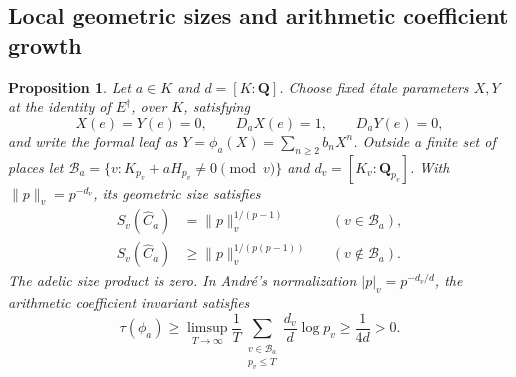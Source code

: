 \documentclass[11pt]{article}
\newtheorem{proposition}[theorem]{Proposition}
\theoremstyle{definition}\newtheorem{definition}[theorem]{Definition}
\theoremstyle{remark}\newtheorem{remark}[theorem]{Remark}
\newcommand{\Q}{\mathbf Q}\newcommand{\Z}{\mathbf Z}
\begin{document}
\subsection{Local geometric sizes and arithmetic coefficient growth}
\begin{proposition}\label{prop:leaf-sizes}
Let $a\in K$ and $d=[K:\Q]$. Choose fixed \'etale parameters $X,Y$ at the identity of $E^\dagger$, over $K$, satisfying
\[
 X(e)=Y(e)=0,\qquad D_aX(e)=1,\qquad D_aY(e)=0,
\]
and write the formal leaf as $Y=\phi_a(X)=\sum_{n\ge2}b_nX^n$. Outside a finite set of places let
$\mathcal B_a=\{v:K_{p_v}+aH_{p_v}\ne0\pmod v\}$ and $d_v=[K_v:\Q_{p_v}]$.
With $\|p\|_v=p^{-d_v}$, its geometric size satisfies
\[
 \begin{aligned}
 S_v(\widehat C_a)&=\|p\|_v^{1/(p-1)}&& (v\in\mathcal B_a),\\
 S_v(\widehat C_a)&\ge\|p\|_v^{1/(p(p-1))}&& (v\notin\mathcal B_a).
 \end{aligned}
\]
The adelic size product is zero. In Andr\'e's normalization $|p|_v=p^{-d_v/d}$, the arithmetic coefficient invariant satisfies
\[
 \tau(\phi_a)\ge\limsup_{T\to\infty}\frac1T
       \sum_{\substack{v\in\mathcal B_a\\p_v\le T}}\frac{d_v}{d}\log p_v
                 \ge\frac1{4d}>0.
\]
\end{proposition}
\end{document}
